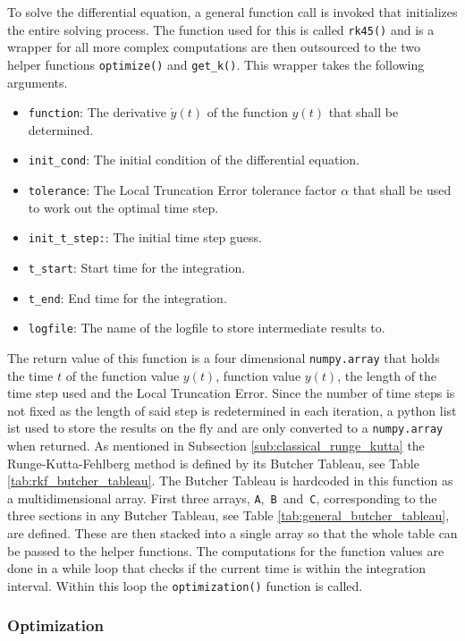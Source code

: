 \documentclass{aa}
\begin{document}
To solve the differential equation, a general function call is invoked that initializes the
entire solving process. The function used for this is called \verb+rk45()+ and is a wrapper for
all more complex computations are then outsourced to the two helper functions \verb+optimize()+
and \verb+get_k()+. This wrapper takes the following arguments.
\begin{itemize}
    \item \verb+function+: The derivative \(\dot{y}(t)\) of the function \(y(t)\) that shall be
        determined.
    \item \verb+init_cond+: The initial condition of the differential equation.
    \item \verb+tolerance+: The Local Truncation Error tolerance factor \(\alpha\) that shall
        be used to work out the optimal time step.
    \item \verb+init_t_step:+: The initial time step guess.
    \item \verb+t_start+: Start time for the integration.
    \item \verb+t_end+: End time for the integration.
    \item \verb+logfile+: The name of the logfile to store intermediate results to.
\end{itemize}
The return value of this function is a four dimensional \verb+numpy.array+ that holds the time
\(t\) of the function value \(y(t)\), function value \(y(t)\), the length of the time step used
and the Local Truncation Error. Since the number of time steps is not fixed as the length of
said step is redetermined in each iteration, a python list ist used to store the results on the
fly and are only converted to a \verb+numpy.array+ when returned. As mentioned in Subsection
\ref{sub:classical_runge_kutta} the Runge-Kutta-Fehlberg method is defined by its Butcher
Tableau, see Table \ref{tab:rkf_butcher_tableau}. The Butcher Tableau is hardcoded in this
function as a multidimensional array. First three arrays, \verb+A+,~\verb+B+~and~\verb+C+,
corresponding to the three sections in any Butcher Tableau, see Table
\ref{tab:general_butcher_tableau}, are defined. These are then stacked into a single array so that the whole
table can be passed to the helper functions. The computations for the function values are done
in a while loop that checks if the current time is within the integration interval. Within this
loop the \verb+optimization()+ function is called.

\subsubsection*{Optimization}%
\label{ssub:optimization}
\end{document}
